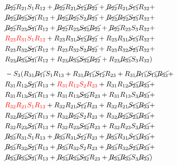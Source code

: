 \begin{equation}
\begin{split}
            &   \cancel{R_{22}}R_{21}S_{1}R_{12} +\cancel{R_{22}}R_{21}\cancel{S_{12}}\cancel{R_{22}} +\cancel{R_{22}}R_{21}\cancel{S_{13}}R_{32} +      \\
            &   \cancel{R_{22}}\cancel{R_{22}}\cancel{S_{21}}R_{12} +\cancel{R_{22}}\cancel{R_{22}}S_{2}\cancel{R_{22}} +\cancel{R_{22}}\cancel{R_{22}}\cancel{S_{23}}R_{32} +      \\
            &   \cancel{R_{22}}R_{23}\cancel{S_{31}}R_{12} +\cancel{R_{22}}R_{23}\cancel{S_{32}}\cancel{R_{22}} +\cancel{R_{22}}R_{23}S_{3}R_{32} +      \\
            &   {\color{red}R_{23}R_{31}S_{1}R_{12}} +R_{23}R_{31}\cancel{S_{12}}\cancel{R_{22}} +R_{23}R_{31}\cancel{S_{13}}R_{32} +      \\
            &   R_{23}R_{32}\cancel{S_{21}}R_{12} +R_{23}R_{32}S_{2}\cancel{R_{22}} +R_{23}R_{32}\cancel{S_{23}}R_{32} +      \\
            &   R_{23}\cancel{R_{33}}\cancel{S_{31}}R_{12} +R_{23}\cancel{R_{33}}\cancel{S_{32}}\cancel{R_{22}} +R_{23}\cancel{R_{33}}S_{3}R_{32}
            )       \\[6pt]
            &   -S_{3}(
                R_{31}\cancel{R_{11}}S_{1}R_{13} +R_{31}\cancel{R_{11}}\cancel{S_{12}}R_{23} +R_{31}\cancel{R_{11}}\cancel{S_{13}}\cancel{R_{33}}  +     \\
           &    R_{31}R_{12}\cancel{S_{21}}R_{13} +{\color{red}R_{31}R_{12}S_{2}R_{23}} +R_{31}R_{12}\cancel{S_{23}}\cancel{R_{33}}  +     \\
           &    R_{31}R_{13}\cancel{S_{31}}R_{13} +R_{31}R_{13}\cancel{S_{32}}R_{23} +R_{31}R_{13}S_{3}\cancel{R_{33}}  +     \\
           &    {\color{red}R_{32}R_{21}S_{1}R_{13}} +R_{32}R_{21}\cancel{S_{12}}R_{23} +R_{32}R_{21}\cancel{S_{13}}\cancel{R_{33}}  +     \\
           &    R_{32}\cancel{R_{22}}\cancel{S_{21}}R_{13} +R_{32}\cancel{R_{22}}S_{2}R_{23} +R_{32}\cancel{R_{22}}\cancel{S_{23}}\cancel{R_{33}}  +     \\
           &    R_{32}R_{23}\cancel{S_{31}}R_{13} +R_{32}R_{23}\cancel{S_{32}}R_{23} +R_{32}R_{23}S_{3}\cancel{R_{33}}  +     \\
           &    \cancel{R_{33}}R_{31}S_{1}R_{13} +\cancel{R_{33}}R_{31}\cancel{S_{12}}R_{23} +\cancel{R_{33}}R_{31}\cancel{S_{13}}\cancel{R_{33}}  +     \\
           &    \cancel{R_{33}}R_{32}\cancel{S_{21}}R_{13} +\cancel{R_{33}}R_{32}S_{2}R_{23} +\cancel{R_{33}}R_{32}\cancel{S_{23}}\cancel{R_{33}}  +     \\
           &    \cancel{R_{33}}\cancel{R_{33}}\cancel{S_{31}}R_{13} +\cancel{R_{33}}\cancel{R_{33}}\cancel{S_{32}}R_{23} +\cancel{R_{33}}\cancel{R_{33}}S_{3}\cancel{R_{33}})
    \end{split}
\end{equation}
